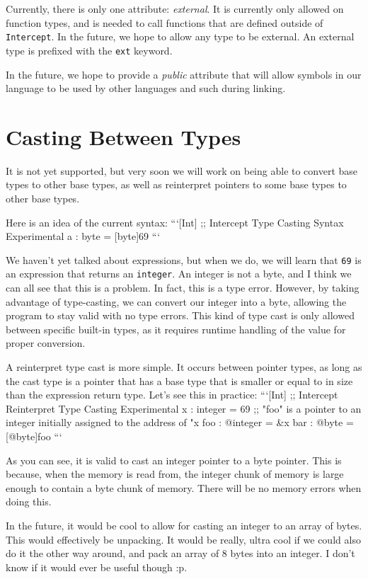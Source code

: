 \documentclass[12pt]{report}
\begin{document}
Currently, there is only one attribute: \emph{external}. It is currently only allowed on function types, and is needed to call functions that are defined outside of \verb|Intercept|. In the future, we hope to allow any type to be external. An external type is prefixed with the \verb|ext| keyword.

In the future, we hope to provide a \emph{public} attribute that will allow symbols in our language to be used by other languages and such during linking.

\section*{Casting Between Types}
\label{sec:types-casting_between_types}

It is not yet supported, but very soon we will work on being able to convert base types to other base types, as well as reinterpret pointers to some base types to other base types.

Here is an idea of the current syntax:
```[Int]
;; Intercept Type Casting Syntax Experimental
a : byte = [byte]69
```

We haven't yet talked about expressions, but when we do, we will learn that \verb|69| is an expression that returns an \verb|integer|. An integer is not a byte, and I think we can all see that this is a problem. In fact, this is a type error. However, by taking advantage of type-casting, we can convert our integer into a byte, allowing the program to stay valid with no type errors. This kind of type cast is only allowed between specific built-in types, as it requires runtime handling of the value for proper conversion.

A reinterpret type cast is more simple. It occurs between pointer types, as long as the cast type is a pointer that has a base type that is smaller or equal to in size than the expression return type. Let's see this in practice:
```[Int]
;; Intercept Reinterpret Type Casting Experimental
x : integer = 69
;; "foo" is a pointer to an integer initially assigned to the address of "x
foo : @integer = &x
bar : @byte = [@byte]foo
```

As you can see, it is valid to cast an integer pointer to a byte pointer. This is because, when the memory is read from, the integer chunk of memory is large enough to contain a byte chunk of memory. There will be no memory errors when doing this.

In the future, it would be cool to allow for casting an integer to an array of bytes. This would effectively be unpacking. It would be really, ultra cool if we could also do it the other way around, and pack an array of 8 bytes into an integer. I don't know if it would ever be useful though :p.
\end{document}
